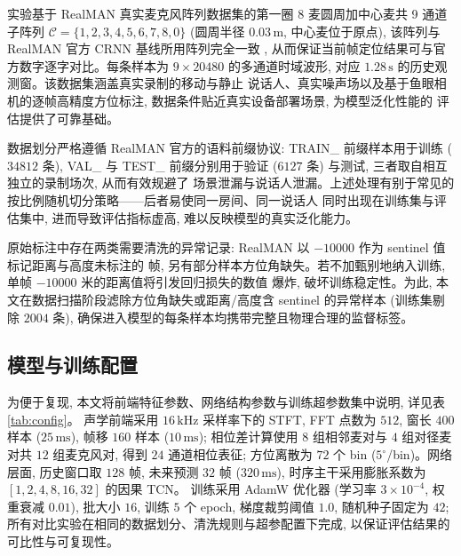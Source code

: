 \documentclass[UTF8,a4paper,11pt]{ctexart}
\begin{document}
实验基于 RealMAN \cite{yang2024realman} 真实麦克风阵列数据集的第一圈 8 麦圆周加中心麦共 9 通道子阵列
$\mathcal{C}=\{1,2,3,4,5,6,7,8,0\}$ (圆周半径 $0.03\,\mathrm{m}$, 中心麦位于原点), 该阵列与 RealMAN 官方
CRNN 基线所用阵列完全一致 \cite{wang2024ipdnet}, 从而保证当前帧定位结果可与官方数字逐字对比。每条样本为
$9\times20480$ 的多通道时域波形, 对应 $1.28\,\mathrm{s}$ 的历史观测窗。该数据集涵盖真实录制的移动与静止
说话人、真实噪声场以及基于鱼眼相机的逐帧高精度方位标注, 数据条件贴近真实设备部署场景, 为模型泛化性能的
评估提供了可靠基础。

数据划分严格遵循 RealMAN 官方的语料前缀协议: TRAIN\_ 前缀样本用于训练 ($34812$ 条),
VAL\_ 与 TEST\_ 前缀分别用于验证 ($6127$ 条) 与测试, 三者取自相互独立的录制场次, 从而有效规避了
场景泄漏与说话人泄漏。上述处理有别于常见的按比例随机切分策略——后者易使同一房间、同一说话人
同时出现在训练集与评估集中, 进而导致评估指标虚高, 难以反映模型的真实泛化能力。

原始标注中存在两类需要清洗的异常记录: RealMAN 以 $-10000$ 作为 sentinel 值标记距离与高度未标注的
帧, 另有部分样本方位角缺失。若不加甄别地纳入训练, 单帧 $-10000$ 米的距离值将引发回归损失的数值
爆炸, 破坏训练稳定性。为此, 本文在数据扫描阶段滤除方位角缺失或距离/高度含 sentinel 的异常样本
(训练集剔除 $2004$ 条), 确保进入模型的每条样本均携带完整且物理合理的监督标签。

\subsection{模型与训练配置}

为便于复现, 本文将前端特征参数、网络结构参数与训练超参数集中说明, 详见表 \ref{tab:config}。
声学前端采用 $16\,\mathrm{kHz}$ 采样率下的 STFT, FFT 点数为 $512$, 窗长 $400$ 样本 ($25\,\mathrm{ms}$),
帧移 $160$ 样本 ($10\,\mathrm{ms}$); 相位差计算使用 $8$ 组相邻麦对与 $4$ 组对径麦对共 $12$ 组麦克风对,
得到 $24$ 通道相位表征; 方位离散为 $72$ 个 bin ($5^\circ$/bin)。网络层面, 历史窗口取 $128$ 帧,
未来预测 $32$ 帧 ($320\,\mathrm{ms}$), 时序主干采用膨胀系数为 $[1,2,4,8,16,32]$ 的因果 TCN。
训练采用 AdamW 优化器 (学习率 $3{\times}10^{-4}$, 权重衰减 $0.01$), 批大小 $16$, 训练 $5$ 个 epoch,
梯度裁剪阈值 $1.0$, 随机种子固定为 $42$; 所有对比实验在相同的数据划分、清洗规则与超参配置下完成,
以保证评估结果的可比性与可复现性。
\end{document}
